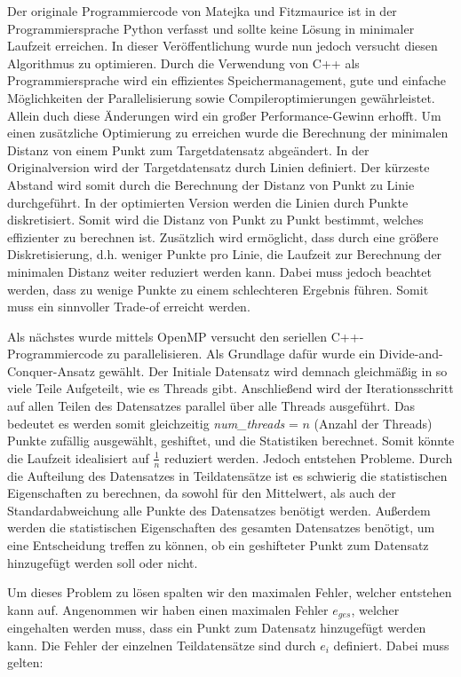 \documentclass[sigconf]{acmart}
\begin{document}
Der originale Programmiercode von Matejka und Fitzmaurice\cite{matejka2017same} ist in der Programmiersprache Python verfasst und sollte keine Lösung in minimaler Laufzeit erreichen. In dieser Veröffentlichung wurde nun jedoch versucht diesen Algorithmus zu optimieren. Durch die Verwendung von C++ als Programmiersprache wird ein effizientes Speichermanagement, gute und einfache Möglichkeiten der Parallelisierung sowie Compileroptimierungen gewährleistet. Allein duch diese Änderungen wird ein großer Performance-Gewinn erhofft. 
Um einen zusätzliche Optimierung zu erreichen wurde die Berechnung der minimalen Distanz von einem Punkt zum Targetdatensatz abgeändert. In der Originalversion wird der Targetdatensatz durch Linien definiert. Der kürzeste Abstand wird somit durch die Berechnung der Distanz von Punkt zu Linie durchgeführt. In der optimierten Version werden die Linien durch Punkte diskretisiert. Somit wird die Distanz von Punkt zu Punkt bestimmt, welches effizienter zu berechnen ist. Zusätzlich wird ermöglicht, dass durch eine größere Diskretisierung, d.h. weniger Punkte pro Linie, die Laufzeit zur Berechnung der minimalen Distanz weiter reduziert werden kann. Dabei muss jedoch beachtet werden, dass zu wenige Punkte zu einem schlechteren Ergebnis führen. Somit muss ein sinnvoller Trade-of erreicht werden.

Als nächstes wurde mittels OpenMP versucht den seriellen C++-Programmiercode zu parallelisieren. Als Grundlage dafür wurde ein Divide-and-Conquer-Ansatz gewählt. Der Initiale Datensatz wird demnach gleichmäßig in so viele Teile Aufgeteilt, wie es Threads gibt. Anschließend wird der Iterationsschritt auf allen Teilen des Datensatzes parallel über alle Threads ausgeführt. Das bedeutet es werden somit gleichzeitig \textit{num\_threads} = $n$ (Anzahl der Threads) Punkte zufällig ausgewählt, geshiftet, und die Statistiken berechnet. Somit könnte die Laufzeit idealisiert auf $\frac{1}{n}$ reduziert werden.
Jedoch entstehen Probleme. Durch die Aufteilung des Datensatzes in Teildatensätze ist es schwierig die statistischen Eigenschaften zu berechnen, da sowohl für den Mittelwert, als auch der Standardabweichung alle Punkte des Datensatzes benötigt werden. Außerdem werden die statistischen Eigenschaften des gesamten Datensatzes benötigt, um eine Entscheidung treffen zu können, ob ein geshifteter Punkt zum Datensatz hinzugefügt werden soll oder nicht.  

Um dieses Problem zu lösen spalten wir den maximalen Fehler, welcher entstehen kann auf. Angenommen wir haben einen maximalen Fehler $e_{ges}$, welcher eingehalten werden muss, dass ein Punkt zum Datensatz hinzugefügt werden kann. Die Fehler der einzelnen Teildatensätze sind durch $e_i$ definiert. Dabei muss gelten:
\end{document}
